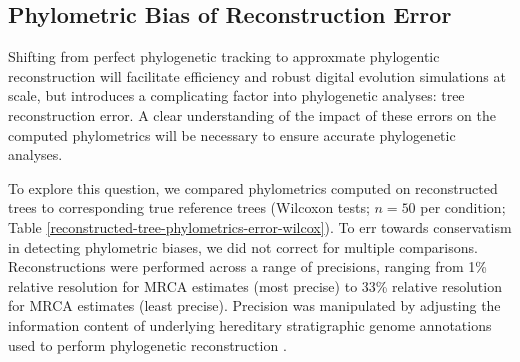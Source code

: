 





\subsection{Phylometric Bias of Reconstruction Error} \label{sec:phylometric-bias-reconstruction-error}

Shifting from perfect phylogenetic tracking to approxmate phylogentic reconstruction will facilitate efficiency and robust digital evolution simulations at scale, but introduces a complicating factor into phylogenetic analyses: tree reconstruction error.
A clear understanding of the impact of these errors on the computed phylometrics will be necessary to ensure accurate phylogenetic analyses.

To explore this question, we compared phylometrics computed on reconstructed trees to corresponding true reference trees (Wilcoxon tests; $n=50$ per condition; Table \ref{reconstructed-tree-phylometrics-error-wilcox}).
To err towards conservatism in detecting phylometric biases, we did not correct for multiple comparisons.
Reconstructions were performed across a range of precisions, ranging from 1\% relative resolution for MRCA estimates (most precise) to 33\% relative resolution for MRCA estimates (least precise).
Precision was manipulated by adjusting the information content of underlying hereditary stratigraphic genome annotations used to perform phylogenetic reconstruction \citep{moreno2022hereditary}.

